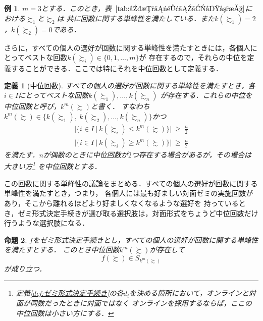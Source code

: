 \documentclass[dvipdfmx]{jsarticle}
\newtheorem{definition}{定義}
\newtheorem{proposition}[definition]{命題}
\newtheorem{example}{例}
\begin{document}
\begin{example}
  $m=3$とする．このとき，表~$\ref{tab:回数に関する単峰性}$における$\succsim_1$と$\succsim_2$は
  共に回数に関する単峰性を満たしている．また$k(\succsim_1) = 2$，$k(\succsim_2) = 0$である．
\end{example}

さらに，すべての個人の選好が回数に関する単峰性を満たすときには，各個人にとってベストな回数$k(\succsim_i) \in \{0,1,\ldots,m\}$が
存在するので，それらの中位を定義することができる．ここでは特にそれを中位回数として定義する．

\begin{definition}[中位回数]\label{def:中位回数}
  すべての個人の選好が回数に関する単峰性を満たすとき，各$i \in I$にとってベストな回数$k(\succsim_1),\ldots,k(\succsim_n)$
  が存在する．これらの中位を中位回数と呼び，$k^m(\succsim)$と書く．
  すなわち$k^m(\succsim) \in \{k(\succsim_1),\ k(\succsim_2), \ldots, k(\succsim_n) \}$かつ
  \begin{gather*}
    |\{i \in I \ | \ k(\succsim_i) \leq k^m(\succsim) \}| \ \geq \ \frac{n}{2} \\
    |\{i \in I \ | \ k(\succsim_i) \geq k^m(\succsim) \}| \ \geq \ \frac{n}{2}
  \end{gather*}
  を満たす．$n$が偶数のときに中位回数が$2$つ存在する場合があるが，その場合は大きい方\footnote{
    定義\ref{def:ゼミ形式決定手続き}の各$d_i$を決める箇所において，オンラインと対面が同数だったときに対面ではなく
    オンラインを採用するならば，ここの中位回数は小さい方にする．
  }
  を中位回数とする．
\end{definition}

この回数に関する単峰性の議論をまとめる．すべての個人の選好が回数に関する単峰性を満たすとき，つまり，
各個人には最も好ましい対面ゼミの実施回数があり，そこから離れるほどより好ましくなくなるような選好を
持っているとき，ゼミ形式決定手続きが選び取る選択肢は，対面形式をちょうど中位回数だけ行うような選択肢になる．

\begin{proposition}
  $f$をゼミ形式決定手続きとし，すべての個人の選好が回数に関する単峰性を満たすとする．
  このとき中位回数$k^m(\succsim)$が存在して
  \[
    f(\succsim) \in S_{k^m(\succsim)}
  \]
  が成り立つ．
\end{proposition}
\end{document}

